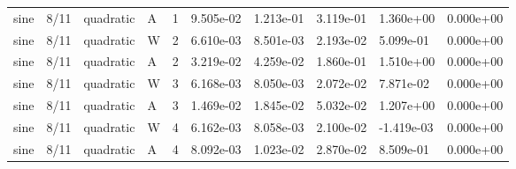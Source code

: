 \begin{tabular}{llllllllll}
sine & 8/11 & quadratic & A & 1 & 9.505e-02 & 1.213e-01 & 3.119e-01 & 1.360e+00 & 0.000e+00 \\
sine & 8/11 & quadratic & W & 2 & 6.610e-03 & 8.501e-03 & 2.193e-02 & 5.099e-01 & 0.000e+00 \\
sine & 8/11 & quadratic & A & 2 & 3.219e-02 & 4.259e-02 & 1.860e-01 & 1.510e+00 & 0.000e+00 \\
sine & 8/11 & quadratic & W & 3 & 6.168e-03 & 8.050e-03 & 2.072e-02 & 7.871e-02 & 0.000e+00 \\
sine & 8/11 & quadratic & A & 3 & 1.469e-02 & 1.845e-02 & 5.032e-02 & 1.207e+00 & 0.000e+00 \\
sine & 8/11 & quadratic & W & 4 & 6.162e-03 & 8.058e-03 & 2.100e-02 & -1.419e-03 & 0.000e+00 \\
sine & 8/11 & quadratic & A & 4 & 8.092e-03 & 1.023e-02 & 2.870e-02 & 8.509e-01 & 0.000e+00 \\
\bottomrule
\end{tabular}
